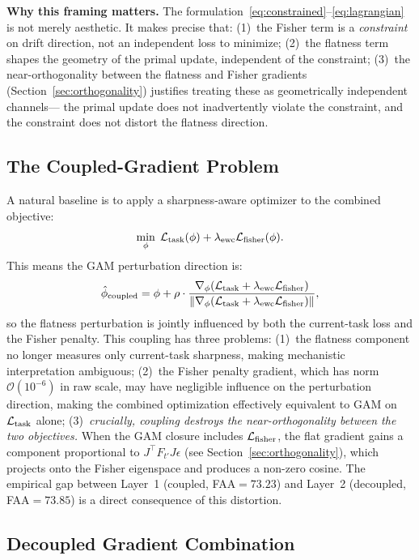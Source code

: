 \textbf{Why this framing matters.}
The formulation~\eqref{eq:constrained}--\eqref{eq:lagrangian} is not merely aesthetic.
It makes precise that:
(1)~the Fisher term is a \emph{constraint} on drift direction, not an independent loss to minimize;
(2)~the flatness term shapes the geometry of the primal update, independent of the constraint;
(3)~the near-orthogonality between the flatness and Fisher gradients
(Section~\ref{sec:orthogonality}) justifies treating these as geometrically independent channels---
the primal update does not inadvertently violate the constraint, and the constraint does not
distort the flatness direction.

\subsection{The Coupled-Gradient Problem}

A natural baseline is to apply a sharpness-aware optimizer to the combined objective:
\begin{equation}
  \min_\phi \; \mathcal{L}_{\mathrm{task}}(\phi) + \lambda_{\mathrm{ewc}} \mathcal{L}_{\mathrm{fisher}}(\phi).
  \label{eq:coupled}
\end{equation}
This means the GAM perturbation direction is:
\begin{equation}
  \hat{\phi}_{\mathrm{coupled}} = \phi + \rho \cdot \frac{\nabla_\phi (\mathcal{L}_{\mathrm{task}} + \lambda_{\mathrm{ewc}} \mathcal{L}_{\mathrm{fisher}})}
  {\|\nabla_\phi (\mathcal{L}_{\mathrm{task}} + \lambda_{\mathrm{ewc}} \mathcal{L}_{\mathrm{fisher}})\|},
\end{equation}
so the flatness perturbation is jointly influenced by both the current-task loss and the Fisher penalty.
This coupling has three problems:
(1)~the flatness component no longer measures only current-task sharpness, making mechanistic
interpretation ambiguous;
(2)~the Fisher penalty gradient, which has norm $\mathcal{O}(10^{-6})$ in raw scale,
may have negligible influence on the perturbation direction, making the combined optimization
effectively equivalent to GAM on $\mathcal{L}_{\mathrm{task}}$ alone;
(3)~\emph{crucially, coupling destroys the near-orthogonality between the two objectives.}
When the GAM closure includes $\mathcal{L}_{\mathrm{fisher}}$, the flat gradient gains a component
proportional to $J^\top F_{t'} J\epsilon$ (see Section~\ref{sec:orthogonality}),
which projects onto the Fisher eigenspace and produces a non-zero cosine.
The empirical gap between Layer~1 (coupled, FAA$=73.23$) and Layer~2 (decoupled, FAA$=73.85$)
is a direct consequence of this distortion.

\subsection{Decoupled Gradient Combination}
\label{sec:decoupled}

